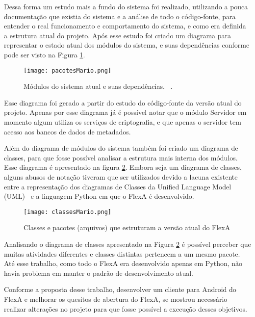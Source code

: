         Dessa forma um estudo mais a fundo do sistema foi realizado, utilizando a pouca documentação que existia do sistema e a análise de todo o código-fonte, para entender o real funcionamento e comportamento do sistema, e como era definida a estrutura atual do projeto. Após esse estudo foi criado um diagrama para representar o estado atual dos módulos do sistema, e suas dependências conforme pode ser visto na Figura \ref{fig:pacotesMario}.
        
        \begin{figure}[!ht]
            \centering
            \texttt{[image: pacotesMario.png]}
            \caption{Módulos do sistema atual e suas dependências. ~\cite{mario}.}
            \label{fig:pacotesMario}
        \end{figure}
        
        Esse diagrama foi gerado a partir do estudo do código-fonte da versão atual do projeto. Apenas por esse diagrama já é possível notar que o módulo Servidor em momento algum utiliza os serviços de criptografia, e que apenas o servidor tem acesso aos bancos de dados de metadados.
        
        Além do diagrama de módulos do sistema também foi criado um diagrama de classes, para que fosse possível analisar a estrutura mais interna dos módulos. Esse diagrama é apresentado na figura \ref{fig:classesMario}. Embora seja um diagrama de classes, alguns abusos de notação tiveram que ser utilizados devido a lacuna existente entre a representação dos diagramas de Classes da Unified Language Model (UML)~\cite{umlClasses} e a linguagem Python em que o FlexA é desenvolvido.
        
        \begin{figure}[!ht]
        \centering
        \texttt{[image: classesMario.png]}
        \caption{Classes e pacotes (arquivos) que estruturam a versão atual do FlexA}
        \label{fig:classesMario}
        \end{figure}
             

        Analisando o diagrama de classes apresentado na Figura \ref{fig:classesMario} é possível perceber que muitas atividades diferentes e classes distintas pertencem a um mesmo pacote. Até esse trabalho, como todo o FlexA era desenvolvido apenas em Python, não havia problema em manter o padrão de desenvolvimento atual. 
        
        Conforme a proposta desse trabalho, desenvolver um cliente para Android do FlexA e melhorar os quesitos de abertura do FlexA, se mostrou necessário realizar alterações no projeto para que fosse possível a execução desses objetivos.
        
